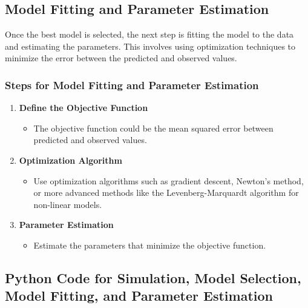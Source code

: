 \documentclass[english, a4paper, 11pt]{article}
\begin{document}
\subsection*{Model Fitting and Parameter Estimation}

Once the best model is selected, the next step is fitting the model to the data and estimating the parameters. This involves using optimization techniques to minimize the error between the predicted and observed values.


\subsubsection*{Steps for Model Fitting and Parameter Estimation}

\begin{enumerate}
    \item \textbf{Define the Objective Function}
          \begin{itemize}
              \item The objective function could be the mean squared error between predicted and observed values.
          \end{itemize}
    \item \textbf{Optimization Algorithm}
          \begin{itemize}
              \item Use optimization algorithms such as gradient descent, Newton's method, or more advanced methods like the Levenberg-Marquardt algorithm for non-linear models.
          \end{itemize}
    \item \textbf{Parameter Estimation}
          \begin{itemize}
              \item Estimate the parameters that minimize the objective function.
          \end{itemize}
\end{enumerate}

\subsection*{Python Code for Simulation, Model Selection, Model Fitting, and Parameter Estimation}
\end{document}

